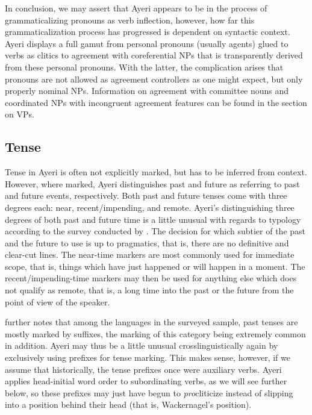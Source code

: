 In conclusion, we may assert that Ayeri appears to be in the process of
grammaticalizing pronouns as verb inflection, however, how far this
grammaticalization process has progressed is dependent on syntactic context.
Ayeri displays a full gamut from personal pronouns (usually agents) glued to
verbs as clitics to agreement with coreferential NPs that is transparently
derived from these personal pronouns. With the latter, the complication arises
that pronouns are not allowed as agreement controllers as one might expect, but
only properly nominal NPs. Information on agreement with committee nouns and
coordinated NPs with incongruent agreement features can be found in the section
on VPs.


\subsection{Tense}
\label{subsec:tense}

Tense in Ayeri is often not explicitly marked, but has to be inferred from
context. However, where marked, Ayeri distinguishes past and future as
referring to past and future events, respectively. Both past and future tenses
come with three degrees each: near, recent/impending, and remote. Ayeri's
distinguishing three degrees of both past and future time is a little unusual
with regards to typology according to the survey conducted by
\citet[127]{dahl1985}. The decision for which subtier of the past and the
future to use is up to pragmatics, that is, there are no definitive and 
clear-cut lines. The near-time markers are most commonly used for immediate 
scope, that is, things which have just happened or will happen in a moment. 
The recent/impending-time markers may then be used for anything else which 
does not qualify as remote, that is, a long time into the past or the future 
from the point of view of the speaker.

\citet[117]{dahl1985} further notes that among the languages in the surveyed
sample, past tenses are mostly marked by suffixes, the marking of this category
being extremely common in addition. Ayeri may thus be a little unusual
crosslinguistically again by exclusively using prefixes for tense marking. This
makes sense, however, if we assume that historically, the tense prefixes once
were auxiliary verbs. Ayeri applies head-initial word order to subordinating
verbs, as we will see further below, so these prefixes may just have begun to
\emph{pro}cliticize instead of slipping into a position behind their head (that
is, Wackernagel's position).

